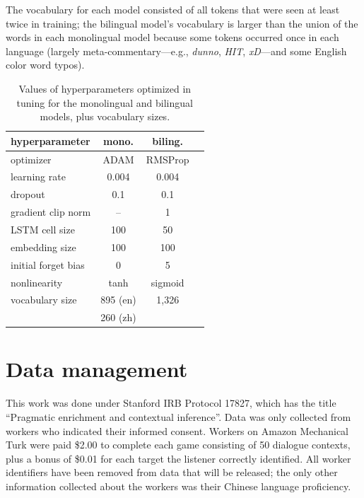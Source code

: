 \documentclass[11pt,a4paper]{article}
\renewcommand{\|}{\mid}
\newcommand{\word}[1]{\emph{#1}}
\begin{document}
The vocabulary for each model consisted of all tokens that were seen at least twice in training; the bilingual
model's vocabulary is larger than the union of the words in each monolingual model because some tokens occurred once in each language
(largely meta-commentary---e.g., \word{dunno}, \word{HIT}, \word{xD}---and some English color word typos).

\begin{table}[!h]
\centering
\begin{tabular}{lccc}
\toprule
hyperparameter      & mono. & biling. \\
\midrule
optimizer           & ADAM  & RMSProp \\
learning rate       & 0.004 & 0.004 \\
dropout             & 0.1   & 0.1 \\
gradient clip norm  & --    & 1 \\
LSTM cell size      & 100   & 50 \\
embedding size      & 100   & 100 \\
initial forget bias & 0     & 5 \\
nonlinearity        & tanh  & sigmoid \\
\midrule
vocabulary size     & 895 (en) & 1,326 \\
                    & 260 (zh) & \\
\bottomrule
\end{tabular}
\caption{Values of hyperparameters optimized in tuning for the monolingual and bilingual models, plus vocabulary sizes.}
\label{tab:hyperparameters}
\end{table}

\section{Data management} \label{sec:irb}

This work was done under
Stanford IRB Protocol 17827, which has the title ``Pragmatic enrichment and contextual inference''.
Data was only collected from workers who indicated their informed consent.
Workers on Amazon Mechanical Turk were paid \$2.00 to complete each game consisting of 50 dialogue contexts, plus
a bonus of \$0.01 for each target the listener correctly identified.
All worker identifiers have been removed from data that will be released; the only other information collected
about the workers was their Chinese language proficiency.
\end{document}
